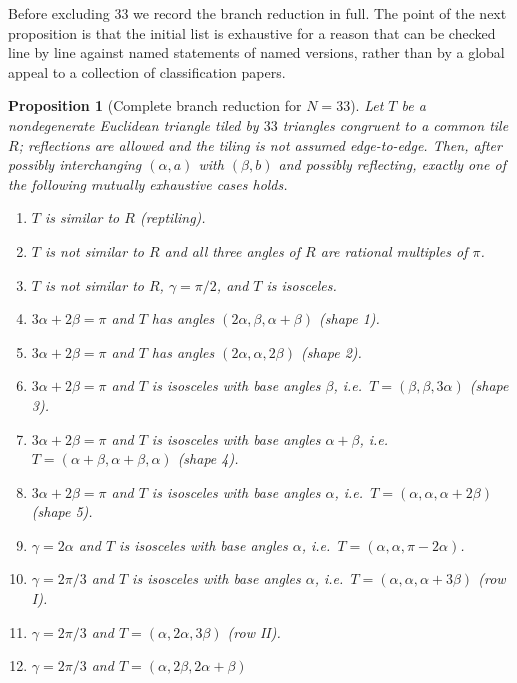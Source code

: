 \documentclass[11pt]{amsart}
\newtheorem{proposition}[theorem]{Proposition}
\theoremstyle{definition}
\theoremstyle{remark}
\begin{document}
Before excluding $33$ we record the branch reduction in full.  The point of
the next proposition is that the initial list is exhaustive for a reason that
can be checked line by line against named statements of named versions,
rather than by a global appeal to a collection of classification papers.

\begin{proposition}[Complete branch reduction for $N=33$]
\label{prop:reduction33}
Let $T$ be a nondegenerate Euclidean triangle tiled by $33$ triangles
congruent to a common tile $R$; reflections are allowed and the tiling is
not assumed edge-to-edge.  Then, after possibly interchanging
$(\alpha,a)$ with $(\beta,b)$ and possibly reflecting, exactly one of the
following mutually exhaustive cases holds.
\begin{enumerate}[label=\textup{(\roman*)},leftmargin=2.6em]
\item $T$ is similar to $R$ \textup{(reptiling)}.
\item $T$ is not similar to $R$ and all three angles of $R$ are rational
      multiples of $\pi$.
\item $T$ is not similar to $R$, $\gamma=\pi/2$, and $T$ is isosceles.
\item $3\alpha+2\beta=\pi$ and $T$ has angles
      $(2\alpha,\beta,\alpha+\beta)$ \textup{(shape 1)}.
\item $3\alpha+2\beta=\pi$ and $T$ has angles $(2\alpha,\alpha,2\beta)$
      \textup{(shape 2)}.
\item $3\alpha+2\beta=\pi$ and $T$ is isosceles with base angles $\beta$,
      i.e.\ $T=(\beta,\beta,3\alpha)$ \textup{(shape 3)}.
\item $3\alpha+2\beta=\pi$ and $T$ is isosceles with base angles
      $\alpha+\beta$, i.e.\ $T=(\alpha+\beta,\alpha+\beta,\alpha)$
      \textup{(shape 4)}.
\item $3\alpha+2\beta=\pi$ and $T$ is isosceles with base angles $\alpha$,
      i.e.\ $T=(\alpha,\alpha,\alpha+2\beta)$ \textup{(shape 5)}.
\item $\gamma=2\alpha$ and $T$ is isosceles with base angles $\alpha$, i.e.\
      $T=(\alpha,\alpha,\pi-2\alpha)$.
\item $\gamma=2\pi/3$ and $T$ is isosceles with base angles $\alpha$, i.e.\
      $T=(\alpha,\alpha,\alpha+3\beta)$ \textup{(row I)}.
\item $\gamma=2\pi/3$ and $T=(\alpha,2\alpha,3\beta)$ \textup{(row II)}.
\item $\gamma=2\pi/3$ and $T=(\alpha,2\beta,2\alpha+\beta)$

\end{enumerate}
\end{proposition}
\end{document}
